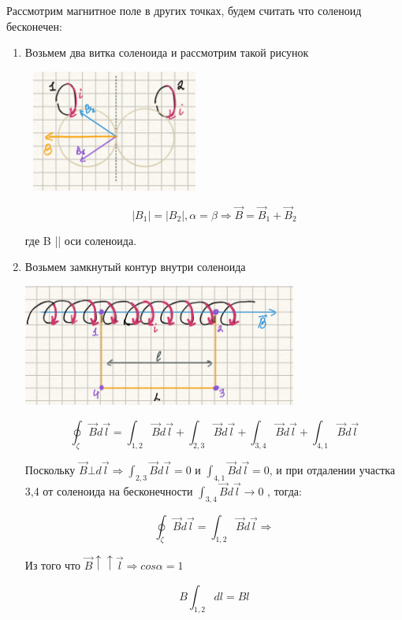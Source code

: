 \documentclass[../main.tex]{subfiles}
\begin{document}
Рассмотрим магнитное поле в других точках, будем считать что соленоид бесконечен:
\begin{enumerate}
    \item Возьмем два витка соленоида и рассмотрим такой рисунок
    \begin{center}
        \includegraphics[width=6cm, height=4cm]{../img/soly_1.png}
    \end{center}
    \[|B_1| = |B_2| , \alpha = \beta \Rightarrow \vec B = \vec B_1 + \vec B_2\]
    \begin{center}
        где B || оси соленоида.
    \end{center}

    \item Возьмем замкнутый контур внутри соленоида 
    \begin{center}  
        \includegraphics[width=9cm, height=4cm]{../img/soly_2.png}
    \end{center}
    \[ \oint_{\zeta} \vec B d \vec l = \int_{1,2} \vec B d \vec l + \int_{2,3} \vec B d \vec l + \int_{3,4} \vec B d \vec l + \int_{4,1} \vec B d \vec l\]
        
    \vspace{5px}

    Поскольку $\vec B \bot d \vec l \Rightarrow \int_{2,3} \vec B d \vec l = 0$ и $\int_{4,1} \vec B d \vec l = 0$,
    и при отдалении участка 3,4 от соленоида на бесконечности $\int_{3,4} \vec B d \vec l \to 0$ ,
    тогда:
    
    \[\oint_{\zeta} \vec B d \vec l = \int_{1,2} \vec B d \vec l \Rightarrow\]
    \begin{center}
        Из того что $\vec B \uparrow \uparrow \vec l \Rightarrow cos{\alpha} = 1$
    \end{center}
    \[B\int_{1,2} dl = Bl\]


\end{enumerate}
\end{document}
